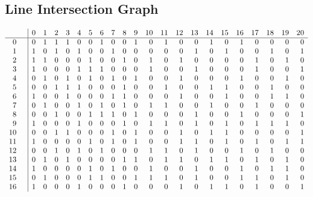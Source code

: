 \documentclass{article}
\begin{document}
{\subsection*{Line Intersection Graph}
{\arraycolsep=1pt
$$
\begin{array}{rr|*{21}r}
 &  & 0 & 1 & 2 & 3 & 4 & 5 & 6 & 7 & 8 & 9 & 10 & 11 & 12 & 13 & 14 & 15 & 16 & 17 & 18 & 19 & 20\\
\hline
0 &  & 0 & 1 & 1 & 1 & 0 & 0 & 1 & 0 & 0 & 1 & 0 & 1 & 0 & 0 & 1 & 0 & 1 & 0 & 0 & 0 & 0\\
1 &  & 1 & 0 & 1 & 0 & 1 & 0 & 0 & 1 & 0 & 0 & 0 & 0 & 0 & 1 & 0 & 1 & 0 & 0 & 1 & 0 & 1\\
2 &  & 1 & 1 & 0 & 0 & 0 & 1 & 0 & 0 & 1 & 0 & 1 & 0 & 1 & 0 & 0 & 0 & 0 & 1 & 0 & 1 & 0\\
3 &  & 1 & 0 & 0 & 0 & 1 & 1 & 1 & 0 & 0 & 0 & 1 & 0 & 0 & 1 & 0 & 0 & 0 & 1 & 0 & 0 & 1\\
4 &  & 0 & 1 & 0 & 1 & 0 & 1 & 0 & 1 & 0 & 1 & 0 & 0 & 1 & 0 & 0 & 0 & 1 & 0 & 0 & 1 & 0\\
5 &  & 0 & 0 & 1 & 1 & 1 & 0 & 0 & 0 & 1 & 0 & 0 & 1 & 0 & 0 & 1 & 1 & 0 & 0 & 1 & 0 & 0\\
6 &  & 1 & 0 & 0 & 1 & 0 & 0 & 0 & 1 & 1 & 0 & 0 & 0 & 1 & 0 & 0 & 1 & 0 & 0 & 1 & 1 & 0\\
7 &  & 0 & 1 & 0 & 0 & 1 & 0 & 1 & 0 & 1 & 0 & 1 & 1 & 0 & 0 & 1 & 0 & 0 & 1 & 0 & 0 & 0\\
8 &  & 0 & 0 & 1 & 0 & 0 & 1 & 1 & 1 & 0 & 1 & 0 & 0 & 0 & 1 & 0 & 0 & 1 & 0 & 0 & 0 & 1\\
9 &  & 1 & 0 & 0 & 0 & 1 & 0 & 0 & 0 & 1 & 0 & 1 & 1 & 0 & 1 & 0 & 1 & 0 & 1 & 1 & 1 & 0\\
10 &  & 0 & 0 & 1 & 1 & 0 & 0 & 0 & 1 & 0 & 1 & 0 & 0 & 1 & 0 & 1 & 1 & 0 & 0 & 0 & 0 & 1\\
11 &  & 1 & 0 & 0 & 0 & 0 & 1 & 0 & 1 & 0 & 1 & 0 & 0 & 1 & 1 & 0 & 1 & 0 & 1 & 0 & 1 & 1\\
12 &  & 0 & 0 & 1 & 0 & 1 & 0 & 1 & 0 & 0 & 0 & 1 & 1 & 0 & 1 & 0 & 0 & 1 & 0 & 1 & 0 & 0\\
13 &  & 0 & 1 & 0 & 1 & 0 & 0 & 0 & 0 & 1 & 1 & 0 & 1 & 1 & 0 & 1 & 1 & 0 & 1 & 0 & 1 & 0\\
14 &  & 1 & 0 & 0 & 0 & 0 & 1 & 0 & 1 & 0 & 0 & 1 & 0 & 0 & 1 & 0 & 0 & 1 & 0 & 1 & 1 & 0\\
15 &  & 0 & 1 & 0 & 0 & 0 & 1 & 1 & 0 & 0 & 1 & 1 & 1 & 0 & 1 & 0 & 0 & 1 & 1 & 0 & 1 & 0\\
16 &  & 1 & 0 & 0 & 0 & 1 & 0 & 0 & 0 & 1 & 0 & 0 & 0 & 1 & 0 & 1 & 1 & 0 & 1 & 0 & 0 & 1\\

\end{array}$$}}
\end{document}
